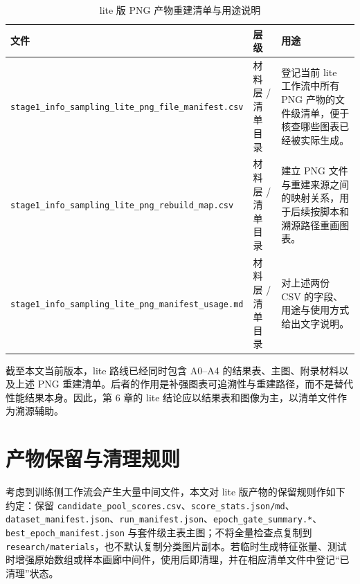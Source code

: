 \documentclass[UTF8,openany,12pt]{ctexbook}
\begin{document}
\begin{table}[H]
    \centering
    \caption{lite 版 PNG 产物重建清单与用途说明}
    \label{tab:lite-png-manifests}
    \begin{tabularx}{\textwidth}{p{5.0cm}p{3.4cm}X}
        \toprule
        文件 & 层级 & 用途 \\
        \midrule
        \texttt{stage1\_info\_sampling\_lite\_png\_file\_manifest.csv} & 材料层 / 清单目录 & 登记当前 lite 工作流中所有 PNG 产物的文件级清单，便于核查哪些图表已经被实际生成。 \\
        \texttt{stage1\_info\_sampling\_lite\_png\_rebuild\_map.csv} & 材料层 / 清单目录 & 建立 PNG 文件与重建来源之间的映射关系，用于后续按脚本和溯源路径重画图表。 \\
        \texttt{stage1\_info\_sampling\_lite\_png\_manifest\_usage.md} & 材料层 / 清单目录 & 对上述两份 CSV 的字段、用途与使用方式给出文字说明。 \\
        \bottomrule
    \end{tabularx}
\end{table}

截至本文当前版本，lite 路线已经同时包含 A0--A4 的结果表、主图、附录材料以及上述 PNG 重建清单。后者的作用是补强图表可追溯性与重建路径，而不是替代性能结果本身。因此，第 6 章的 lite 结论应以结果表和图像为主，以清单文件作为溯源辅助。

\section{产物保留与清理规则}
考虑到训练侧工作流会产生大量中间文件，本文对 lite 版产物的保留规则作如下约定：保留 \texttt{candidate\_pool\_scores.csv}、\texttt{score\_stats.json/md}、\texttt{dataset\_manifest.json}、\texttt{run\_manifest.json}、\texttt{epoch\_gate\_summary.*}、\texttt{best\_epoch\_manifest.json} 与套件级主表主图；不将全量检查点复制到 \texttt{research/materials}，也不默认复制分类图片副本。若临时生成特征张量、测试时增强原始数组或样本画廊中间件，使用后即清理，并在相应清单文件中登记“已清理”状态。
\end{document}

